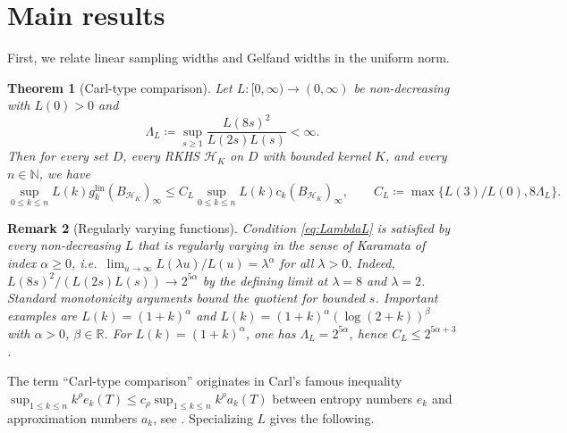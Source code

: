\documentclass[11pt,reqno, a4paper]{article}
\numberwithin{equation}{section}
\newtheorem{theorem}{Theorem}[section]
\newtheorem{remark}[theorem]{Remark}
\newcommand{\N}{\mathbb{N}}
\newcommand{\R}{\mathbb{R}}
\newcommand{\lin}{\ensuremath{\mathrm{lin}}}
\begin{document}
\section{Main results}\label{sec:MainResults}
First, we relate linear sampling widths and Gelfand widths in the uniform norm.
\begin{theorem}[Carl-type comparison]\label{thm:rates}
Let $L\colon[0,\infty)\to(0,\infty)$ be non-decreasing with $L(0)>0$ and
\begin{equation}\label{eq:LambdaL}
  \Lambda_L\coloneqq\sup_{s\ge1}\frac{L(8s)^2}{L(2s)L(s)}<\infty .
\end{equation}
Then for every set $D$, every RKHS $\mathcal H_K$ on $D$ with bounded kernel $K$, and every $n\in\N$, we have
\begin{equation}\label{eq:carl}
    \sup_{0\le k\le n} L(k) g_k^{\lin}(B_{\mathcal H_K})_\infty 
    \le C_L\sup_{0\le k\le n} L(k) c_k(B_{\mathcal H_K})_\infty,
    \qquad C_L\coloneqq\max\bigl\{L(3)/L(0), 8\Lambda_L\bigr\}.
  \end{equation}
\end{theorem}

\begin{remark}[Regularly varying functions]
\label{rem:RV}
Condition \eqref{eq:LambdaL} is satisfied by every non-decreasing $L$ that is regularly varying in the sense of Karamata \cite{BGT87} of index $\alpha\ge0$, i.e.\ $\lim_{u\to\infty}L(\lambda u)/L(u)=\lambda^{\alpha}$ for all $\lambda>0$.
Indeed, $L(8s)^2/(L(2s)L(s))\to 2^{5\alpha}$ by the defining limit at $\lambda=8$ and $\lambda=2$. Standard monotonicity arguments bound the quotient for bounded $s$.
Important examples are $L(k)=(1+k)^{\alpha}$ and $L(k)=(1+k)^{\alpha}(\log(2+k))^{\beta}$ with $\alpha>0$, $\beta\in\R$. For $L(k)=(1+k)^{\alpha}$, one has $\Lambda_L=2^{5\alpha}$, hence $C_L\le 2^{5\alpha+3}$. 
\end{remark}
The term  ``Carl-type comparison'' originates in Carl's famous inequality $\sup_{1\le k\le n}k^{\rho}e_k(T)\le c_\rho\sup_{1\le k\le n}k^{\rho}a_k(T)$ between entropy numbers $e_k$ and approximation numbers $a_k$, see \cite{Carl81,CarlStephani90}.
Specializing $L$ gives the following.
\end{document}
